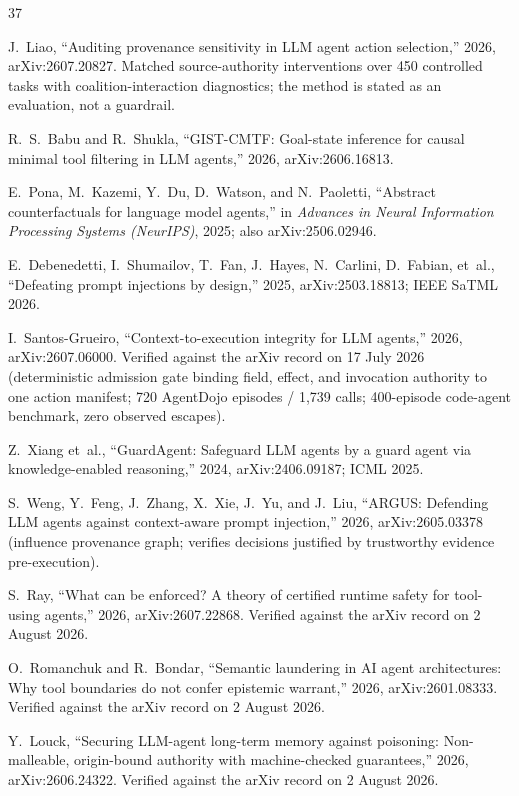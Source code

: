 \documentclass[conference]{IEEEtran}
\begin{document}
\begin{thebibliography}{37}
\footnotesize

 J.~Liao, ``Auditing provenance
sensitivity in LLM agent action selection,'' 2026,
arXiv:2607.20827. Matched source-authority interventions over 450
controlled tasks with coalition-interaction diagnostics; the
method is stated as an evaluation, not a guardrail.

 R.~S.~Babu and R.~Shukla, ``GIST-CMTF:
Goal-state inference for causal minimal tool filtering in LLM
agents,'' 2026, arXiv:2606.16813.

 E.~Pona, M.~Kazemi, Y.~Du, D.~Watson, and
N.~Paoletti, ``Abstract counterfactuals for language model
agents,'' in \emph{Advances in Neural Information Processing
Systems (NeurIPS)}, 2025; also arXiv:2506.02946.

 E.~Debenedetti, I.~Shumailov, T.~Fan, J.~Hayes,
N.~Carlini, D.~Fabian, et~al., ``Defeating prompt injections by
design,'' 2025, arXiv:2503.18813; IEEE SaTML 2026.

 I.~Santos-Grueiro, ``Context-to-execution integrity
for LLM agents,'' 2026, arXiv:2607.06000. Verified against the
arXiv record on 17 July 2026 (deterministic admission gate binding
field, effect, and invocation authority to one action manifest;
720 AgentDojo episodes / 1{,}739 calls; 400-episode code-agent
benchmark, zero observed escapes).

 Z.~Xiang et~al., ``GuardAgent: Safeguard LLM
agents by a guard agent via knowledge-enabled reasoning,'' 2024,
arXiv:2406.09187; ICML 2025.

 S.~Weng, Y.~Feng, J.~Zhang, X.~Xie, J.~Yu, and
J.~Liu, ``ARGUS: Defending LLM agents against
context-aware prompt injection,'' 2026, arXiv:2605.03378
(influence provenance graph; verifies decisions justified by
trustworthy evidence pre-execution).

 S.~Ray, ``What can be enforced? A
theory of certified runtime safety for tool-using agents,'' 2026,
arXiv:2607.22868. Verified against the arXiv record on 2 August
2026.

 O.~Romanchuk and R.~Bondar,
``Semantic laundering in AI agent architectures: Why tool
boundaries do not confer epistemic warrant,'' 2026,
arXiv:2601.08333. Verified against the arXiv record on 2 August
2026.

 Y.~Louck, ``Securing LLM-agent long-term
memory against poisoning: Non-malleable, origin-bound authority
with machine-checked guarantees,'' 2026, arXiv:2606.24322.
Verified against the arXiv record on 2 August 2026.


\end{thebibliography}
\end{document}
